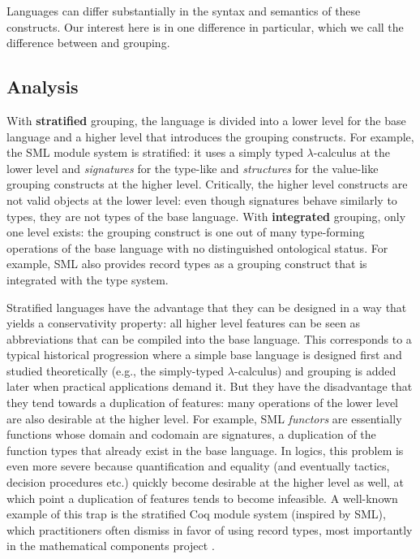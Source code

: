 Languages can differ substantially in the syntax and semantics of these constructs.
Our interest here is in one difference in particular, which we call the difference between  and  grouping.

\subsection{Analysis}

With \textbf{stratified} grouping, the language is divided into a lower level for the base language and a higher level that introduces the grouping constructs.
For example, the SML module system is stratified: it uses a simply typed $\lambda$-calculus at the lower level and \emph{signatures} for the type-like and \emph{structures} for the value-like grouping constructs at the higher level.
Critically, the higher level constructs are not valid objects at the lower level: even though signatures behave similarly to types, they are not types of the base language.
With \textbf{integrated} grouping, only one level exists: the grouping construct is one
out of many type-forming operations of the base language with no distinguished ontological
status.
For example, SML also provides record types as a grouping construct that is integrated with the type system.

Stratified languages have the advantage that they can be designed in a way that yields a conservativity property: all higher level features can be seen as abbreviations that can be compiled into the base language.
This corresponds to a typical historical progression where a simple base language is designed first and studied theoretically (e.g., the simply-typed $\lambda$-calculus) and  grouping is added later when practical applications demand it.
But they have the disadvantage that they tend towards a duplication of features: many operations of the lower level are also desirable at the higher level.
For example, SML \emph{functors} are essentially functions whose domain and codomain are signatures, a duplication of the function types that already exist in the base language.
In logics, this problem is even more severe because quantification and equality (and eventually tactics, decision procedures etc.) quickly become desirable at the higher level as well, at which point a duplication of features tends to become infeasible.
A well-known example of this trap is the stratified Coq module system (inspired by SML), which practitioners often dismiss in favor of using record types, most importantly in the mathematical components project \cite{MathComponents:base}.

